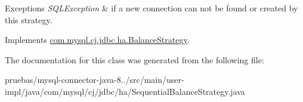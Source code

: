 \begin{DoxyExceptions}{Exceptions}
{\em S\+Q\+L\+Exception} & if a new connection can not be found or created by this strategy. \\
\hline
\end{DoxyExceptions}


Implements \mbox{\hyperlink{interfacecom_1_1mysql_1_1cj_1_1jdbc_1_1ha_1_1_balance_strategy_a754b8e7a4e4baad812f650b3222cfbd5}{com.\+mysql.\+cj.\+jdbc.\+ha.\+Balance\+Strategy}}.



The documentation for this class was generated from the following file\+:\begin{DoxyCompactItemize}
\item 
pruebas/mysql-\/connector-\/java-\/8../src/main/user-\/impl/java/com/mysql/cj/jdbc/ha/Sequential\+Balance\+Strategy.\+java\end{DoxyCompactItemize}
